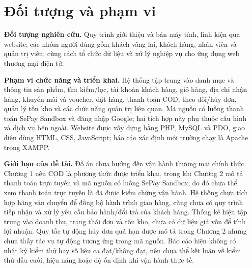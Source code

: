 \section{Đối tượng và phạm vi}
\noindent\textbf{Đối tượng nghiên cứu.} Quy trình giới thiệu và bán máy tính, linh kiện qua website; các nhóm người dùng gồm khách vãng lai, khách hàng, nhân viên và quản trị viên; cùng cách tổ chức dữ liệu và xử lý nghiệp vụ cho ứng dụng web thương mại điện tử.

\noindent\textbf{Phạm vi chức năng và triển khai.} Hệ thống tập trung vào danh mục và thông tin sản phẩm, tìm kiếm/lọc, tài khoản khách hàng, giỏ hàng, địa chỉ nhận hàng, khuyến mãi và voucher, đặt hàng, thanh toán COD, theo dõi/hủy đơn, quản lý tồn kho và các chức năng quản trị liên quan. Mã nguồn có luồng thanh toán SePay Sandbox và đăng nhập Google; hai tích hợp này phụ thuộc cấu hình và dịch vụ bên ngoài. Website được xây dựng bằng PHP, MySQL và PDO, giao diện dùng HTML, CSS, JavaScript; báo cáo xác định môi trường chạy là Apache trong XAMPP.

\noindent\textbf{Giới hạn của đề tài.} Đồ án chưa hướng đến vận hành thương mại chính thức. Chương 1 nêu COD là phương thức được triển khai, trong khi Chương 2 mô tả thanh toán trực tuyến và mã nguồn có luồng SePay Sandbox; do đó chưa thể xem thanh toán trực tuyến là đã được kiểm chứng vận hành. Hệ thống chưa tích hợp hãng vận chuyển để đồng bộ hành trình giao hàng, cũng chưa có quy trình tiếp nhận và xử lý yêu cầu bảo hành/đổi trả của khách hàng. Thống kê hiện tập trung vào doanh thu, trạng thái đơn và tồn kho, chưa có dữ liệu giá vốn để tính lợi nhuận. Quy tắc tự động hủy đơn quá hạn được mô tả trong Chương 2 nhưng chưa thấy tác vụ tự động tương ứng trong mã nguồn. Báo cáo hiện không có nhật ký kiểm thử hay số liệu ca đạt/không đạt, nên chưa thể kết luận về kiểm thử đầu cuối, hiệu năng hoặc độ ổn định khi vận hành thực tế.


